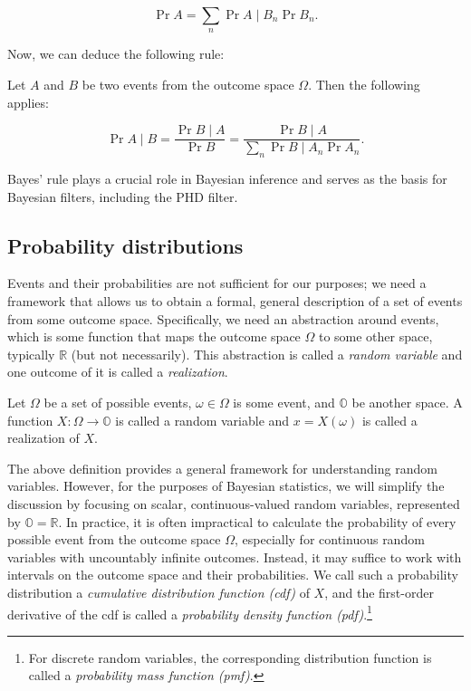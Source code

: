 $$
\Pr{A} = \sum_n \Pr{A \mid B_n} \Pr{B_n}.
$$

Now, we can deduce the following rule:

\begin{definition}
Let $A$ and $B$ be two events from the outcome space $\Omega$. Then the following applies:

$$
\Pr{A \mid B} = \frac{\Pr{B \mid A}}{\Pr{B}}
    = \frac{\Pr{B \mid A}}{\sum_n \Pr{B \mid A_n}\Pr{A_n}}.
$$
\end{definition}

Bayes' rule plays a crucial role in Bayesian inference and serves as the basis for
Bayesian filters, including the PHD filter.

\subsection{Probability distributions}

Events and their probabilities are not sufficient for our purposes;
we need a framework that allows us to obtain a formal, general description of a set
of events from some outcome space. Specifically, we need an abstraction around events,
which is some function that maps the outcome space $\Omega$ to some other space,
typically $\mathbb{R}$ (but not necessarily). This abstraction is called a
\textit{random variable} and one outcome of it is called a \textit{realization}.

\begin{definition}
    Let $\Omega$ be a set of possible events, $\omega \in \Omega$ is some event,
    and $\mathbb{O}$ be another space. A function $X: \Omega \rightarrow \mathbb{O}$
    is called a random variable and $x = X(\omega)$ is called a realization of $X$.
\end{definition}

The above definition provides a general framework for understanding random variables.
However, for the purposes of Bayesian statistics, we will simplify the discussion by
focusing on scalar, continuous-valued random variables, represented
by $\mathbb{O} = \mathbb{R}$. In practice, it is often impractical to calculate the
probability of every possible event from the outcome space $\Omega$, especially for
continuous random variables with uncountably infinite outcomes. Instead, it may suffice
to work with intervals on the outcome space and their probabilities. We call such a
probability distribution a \textit{cumulative distribution function (cdf)} of $X$,
and the first-order derivative of the cdf is called a \textit{probability density
function (pdf)}.\footnote{
    For discrete random variables, the corresponding distribution function is
    called a \textit{probability mass function (pmf)}.
}

